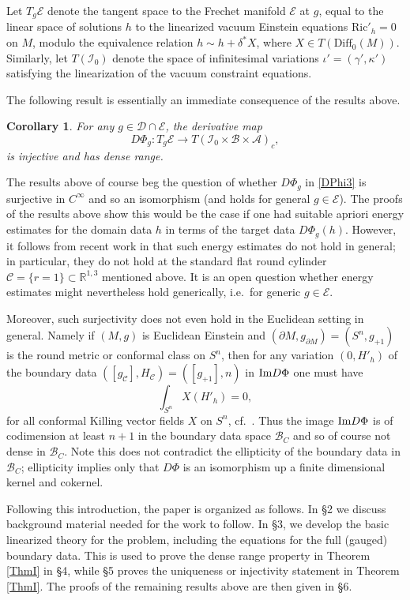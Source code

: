 \documentclass[10pt]{amsart}
\newcommand{\g}{\gamma}
\renewcommand{\d}{\delta}
\renewcommand{\k}{\kappa}
\newcommand{\cA}{{\mathcal A}}
\newcommand{\cC}{{\mathcal C}}
\newcommand{\cB}{{\mathcal B}}
\newcommand{\cE}{{\mathcal E}}
\newcommand{\cD}{{\mathcal D}}
\newcommand{\cI}{\mathcal I}
\newcommand{\bR}{\mathbb R}
\newcommand{\Ric}{\mathrm{Ric}}
\newcommand{\Diff}{\mathrm{Diff}}
\newcommand{\be}{\begin{equation}}
\newcommand{\ee}{\end{equation}}
\newcommand{\p}{\partial}
\renewcommand{\to}{\rightarrow}
\newcommand{\<}{\langle}
\renewcommand{\>}{\rangle}
\newcommand{\dm}{{\partial M}}
\theoremstyle{plain}
\newtheorem{corollary}[lemma]{Corollary}
\theoremstyle{remark}
\theoremstyle{definition}
\numberwithin{equation}{section}
\begin{document}
\medskip 

 Let $T_g \cE$ denote the tangent space to the Frechet manifold $\cE$ at $g$, equal to the linear space of solutions $h$ to the linearized vacuum 
Einstein equations $\Ric'_h = 0$ on $M$, modulo the equivalence relation $h \sim h + \d^*X$, where $X \in T(\Diff_0(M))$.  
Similarly, let $T(\cI_0)$ denote the space of infinitesimal variations $\iota' = (\g', \k')$ satisfying the linearization of the vacuum constraint equations. 

The following result is essentially an immediate consequence of the results above. 
\begin{corollary}\label{ThmIII}
For any $g \in \cD \cap \cE$, the derivative map 
\be \label{DPhi3}
D\Phi_g: T_g\cE \to T(\cI_0\times \cB \times \cA)_c,
\ee
is injective and has dense range. 
\end{corollary}

\medskip 

  The results above of course beg the question of whether $D \Phi_g$ in \eqref{DPhi3} is surjective in $C^{\infty}$ and so an isomorphism (and holds for 
general $g \in \cE$). The proofs of the results above show this would be the case if one had suitable apriori energy estimates for the domain data $h$ in 
terms of the target data $D\Phi_g(h)$. However, it follows from recent work in \cite{LRSW} that such energy estimates do not hold in general; in particular, 
they do not hold at the standard flat round cylinder $\cC = \{r = 1\} \subset \bR^{1,3}$ mentioned above. It is an open question whether energy estimates 
might nevertheless hold generically, i.e.~for generic $g \in \cE$. 

   Moreover, such surjectivity does not even hold in the Euclidean setting in general. Namely if $(M, g)$ is Euclidean Einstein and $(\p M, g_{\dm}) = 
 (S^n, g_{+1})$ is the round metric or conformal class on $S^n$, then for any variation $(0, H'_h)$ of the boundary data $([g_{\cC}], H_{\cC}) = ([g_{+1}], n)$ 
 in ${\rm Im} D\Phi$ one must have 
 $$\int_{S^n}X(H'_h) = 0,$$
 for all conformal Killing vector fields $X$ on $S^n$, cf.~\cite{A3}. Thus the image ${\rm Im} D\Phi$ is of codimension at least $n+1$ in the boundary data 
space $\cB_C$ and so of course not dense in $\cB_C$. Note this does not contradict the ellipticity of the boundary data in $\cB_C$; ellipticity implies 
only that $D\Phi$ is an isomorphism up a finite dimensional kernel and cokernel. 

\medskip 

   Following this introduction, the paper is organized as follows. In \S 2 we discuss background material needed for the work to follow. In \S 3, we develop 
the basic linearized theory for the problem, including the equations for the full (gauged) boundary data. This is used to prove the dense range property 
in Theorem \ref{ThmI} in \S 4, while \S 5 proves the uniqueness or injectivity statement in Theorem \ref{ThmI}. The proofs of the remaining 
results above are then given in \S 6. 
  
\end{document}
